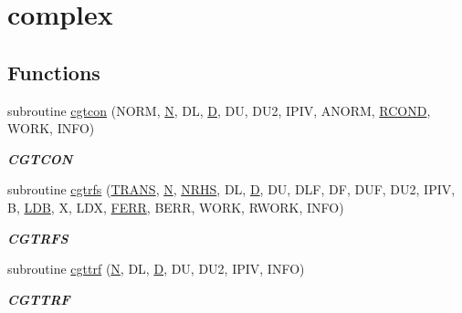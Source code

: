 \hypertarget{group__complexGTcomputational}{}\section{complex}
\label{group__complexGTcomputational}
\subsection*{Functions}
\begin{DoxyCompactItemize}
\item 
subroutine \hyperlink{group__complexGTcomputational_ga8f80227b32b600dc75a5e982005ec1c2}{cgtcon} (N\+O\+R\+M, \hyperlink{polmisc_8c_a0240ac851181b84ac374872dc5434ee4}{N}, D\+L, \hyperlink{odrpack_8h_a7dae6ea403d00f3687f24a874e67d139}{D}, D\+U, D\+U2, I\+P\+I\+V, A\+N\+O\+R\+M, \hyperlink{superlu__enum__consts_8h_af00a42ecad444bbda75cde1b64bd7e72a9b5c151728d8512307565994c89919d5}{R\+C\+O\+N\+D}, W\+O\+R\+K, I\+N\+F\+O)
\begin{DoxyCompactList}\small\item\em {\bfseries C\+G\+T\+C\+O\+N} \end{DoxyCompactList}\item 
subroutine \hyperlink{group__complexGTcomputational_ga92eec53c6ac6c6285a10e7d05d9c00d5}{cgtrfs} (\hyperlink{superlu__enum__consts_8h_a0c4e17b2d5cea33f9991ccc6a6678d62a1f61e3015bfe0f0c2c3fda4c5a0cdf58}{T\+R\+A\+N\+S}, \hyperlink{polmisc_8c_a0240ac851181b84ac374872dc5434ee4}{N}, \hyperlink{example__user_8c_aa0138da002ce2a90360df2f521eb3198}{N\+R\+H\+S}, D\+L, \hyperlink{odrpack_8h_a7dae6ea403d00f3687f24a874e67d139}{D}, D\+U, D\+L\+F, D\+F, D\+U\+F, D\+U2, I\+P\+I\+V, B, \hyperlink{example__user_8c_a50e90a7104df172b5a89a06c47fcca04}{L\+D\+B}, X, L\+D\+X, \hyperlink{superlu__enum__consts_8h_af00a42ecad444bbda75cde1b64bd7e72a78fd14d7abebae04095cfbe02928f153}{F\+E\+R\+R}, B\+E\+R\+R, W\+O\+R\+K, R\+W\+O\+R\+K, I\+N\+F\+O)
\begin{DoxyCompactList}\small\item\em {\bfseries C\+G\+T\+R\+F\+S} \end{DoxyCompactList}\item 
subroutine \hyperlink{group__complexGTcomputational_ga74d1d5397dae5f211149667ea29c36b9}{cgttrf} (\hyperlink{polmisc_8c_a0240ac851181b84ac374872dc5434ee4}{N}, D\+L, \hyperlink{odrpack_8h_a7dae6ea403d00f3687f24a874e67d139}{D}, D\+U, D\+U2, I\+P\+I\+V, I\+N\+F\+O)
\begin{DoxyCompactList}\small\item\em {\bfseries C\+G\+T\+T\+R\+F} \end{DoxyCompactList}\item 

\end{DoxyCompactItemize}
